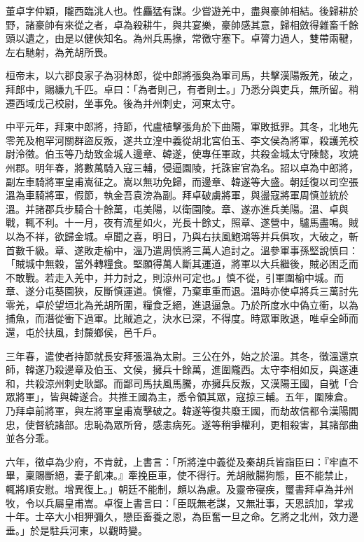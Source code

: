 
\begin{pinyinscope}
董卓字仲穎，隴西臨洮人也。性麤猛有謀。少嘗遊羌中，盡與豪帥相結。後歸耕於野，諸豪帥有來從之者，卓為殺耕牛，與共宴樂，豪帥感其意，歸相斂得雜畜千餘頭以遺之，由是以健俠知名。為州兵馬掾，常徼守塞下。卓膂力過人，雙帶兩鞬，左右馳射，為羌胡所畏。

桓帝末，以六郡良家子為羽林郎，從中郎將張奐為軍司馬，共擊漢陽叛羌，破之，拜郎中，賜縑九千匹。卓曰：「為者則己，有者則士。」乃悉分與吏兵，無所留。稍遷西域戊己校尉，坐事免。後為并州刺史，河東太守。

中平元年，拜東中郎將，持節，代盧植擊張角於下曲陽，軍敗抵罪。其冬，北地先零羌及枹罕河關群盜反叛，遂共立湟中義從胡北宮伯玉、李文侯為將軍，殺護羌校尉泠徵。伯玉等乃劫致金城人邊章、韓遂，使專任軍政，共殺金城太守陳懿，攻燒州郡。明年春，將數萬騎入寇三輔，侵逼園陵，托誅宦官為名。詔以卓為中郎將，副左車騎將軍皇甫嵩征之。嵩以無功免歸，而邊章、韓遂等大盛。朝廷復以司空張溫為車騎將軍，假節，執金吾袁滂為副。拜卓破虜將軍，與盪寇將軍周慎並統於溫。并諸郡兵步騎合十餘萬，屯美陽，以衛園陵。章、遂亦進兵美陽。溫、卓與戰，輒不利。十一月，夜有流星如火，光長十餘丈，照章、遂營中，驢馬盡鳴。賊以為不祥，欲歸金城。卓聞之喜，明日，乃與右扶風鮑鴻等并兵俱攻，大破之，斬首數千級。章、遂敗走榆中，溫乃遣周慎將三萬人追討之。溫參軍事孫堅說慎曰：「賊城中無穀，當外轉糧食。堅願得萬人斷其運道，將軍以大兵繼後，賊必困乏而不敢戰。若走入羌中，并力討之，則涼州可定也。」慎不從，引軍圍榆中城。而章、遂分屯葵園狹，反斷慎運道。慎懼，乃棄車重而退。溫時亦使卓將兵三萬討先零羌，卓於望垣北為羌胡所圍，糧食乏絕，進退逼急。乃於所度水中偽立衝，以為捕魚，而潛從衝下過軍。比賊追之，決水已深，不得度。時眾軍敗退，唯卓全師而還，屯於扶風，封斄鄉侯，邑千戶。

三年春，遣使者持節就長安拜張溫為太尉。三公在外，始之於溫。其冬，徵溫還京師，韓遂乃殺邊章及伯玉、文侯，擁兵十餘萬，進圍隴西。太守李相如反，與遂連和，共殺涼州刺史耿鄙。而鄙司馬扶風馬騰，亦擁兵反叛，又漢陽王國，自號「合眾將軍」，皆與韓遂合。共推王國為主，悉令領其眾，寇掠三輔。五年，圍陳倉。乃拜卓前將軍，與左將軍皇甫嵩擊破之。韓遂等復共廢王國，而劫故信都令漢陽閻忠，使督統諸部。忠恥為眾所脅，感恚病死。遂等稍爭權利，更相殺害，其諸部曲並各分乖。

六年，徵卓為少府，不肯就，上書言：「所將湟中義從及秦胡兵皆詣臣曰：『牢直不畢，稟賜斷絕，妻子飢凍。』牽挽臣車，使不得行。羌胡敝腸狗態，臣不能禁止，輒將順安慰。增異復上。」朝廷不能制，頗以為慮。及靈帝寑疾，璽書拜卓為并州牧，令以兵屬皇甫嵩。卓復上書言曰：「臣既無老謀，又無壯事，天恩誤加，掌戎十年。士卒大小相狎彌久，戀臣畜養之恩，為臣奮一旦之命。乞將之北州，效力邊垂。」於是駐兵河東，以觀時變。


\end{pinyinscope}
